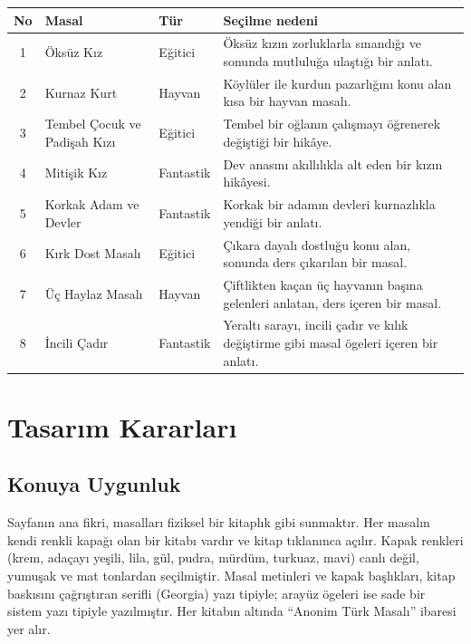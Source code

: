 \documentclass[12pt,a4paper]{article}
\begin{document}
\begin{longtable}{@{}cp{4cm}p{3cm}p{5.4cm}@{}}
\toprule
\textbf{No} & \textbf{Masal} & \textbf{Tür} & \textbf{Seçilme nedeni} \\
\midrule
\endhead
1 & Öksüz Kız & Eğitici & Öksüz kızın zorluklarla sınandığı ve sonunda mutluluğa ulaştığı bir anlatı. \\
2 & Kurnaz Kurt & Hayvan & Köylüler ile kurdun pazarlığını konu alan kısa bir hayvan masalı. \\
3 & Tembel Çocuk ve Padişah Kızı & Eğitici & Tembel bir oğlanın çalışmayı öğrenerek değiştiği bir hikâye. \\
4 & Mitişik Kız & Fantastik & Dev anasını akıllılıkla alt eden bir kızın hikâyesi. \\
5 & Korkak Adam ve Devler & Fantastik & Korkak bir adamın devleri kurnazlıkla yendiği bir anlatı. \\
6 & Kırk Dost Masalı & Eğitici & Çıkara dayalı dostluğu konu alan, sonunda ders çıkarılan bir masal. \\
7 & Üç Haylaz Masalı & Hayvan & Çiftlikten kaçan üç hayvanın başına gelenleri anlatan, ders içeren bir masal. \\
8 & İncili Çadır & Fantastik & Yeraltı sarayı, incili çadır ve kılık değiştirme gibi masal ögeleri içeren bir anlatı. \\
\bottomrule
\end{longtable}

\section{Tasarım Kararları}

\subsection{Konuya Uygunluk}
Sayfanın ana fikri, masalları fiziksel bir kitaplık gibi sunmaktır. Her masalın kendi
renkli kapağı olan bir kitabı vardır ve kitap tıklanınca açılır. Kapak renkleri
(krem, adaçayı yeşili, lila, gül, pudra, mürdüm, turkuaz, mavi) canlı değil, yumuşak ve
mat tonlardan seçilmiştir. Masal metinleri ve kapak başlıkları, kitap baskısını
çağrıştıran serifli (Georgia) yazı tipiyle; arayüz ögeleri ise sade bir sistem yazı
tipiyle yazılmıştır. Her kitabın altında ``Anonim Türk Masalı'' ibaresi yer alır.
\end{document}
